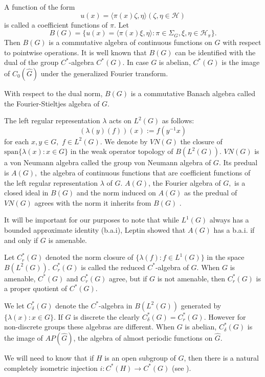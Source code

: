 \documentclass[10pt]{amsart}
\numberwithin{thm}{section}
\numberwithin{equation}{section}
\begin{document}
A function of the form 
\[
u(x)= {\langle} \pi (x)\zeta ,\eta {\rangle} (\zeta ,\eta \in \mathcal{H})\]
is called a coefficient functions of $\pi .$ Let 
\[
B(G)=\{u(x)= \langle\pi (x)\xi ,\eta \rangle: \pi \in \Sigma_{G},\xi ,\eta \in \mathcal{H}_{\pi }\}. 
\]
Then $B(G)$ is a commutative algebra of continuous functions on $G$ with
respect to pointwise operations. It is well known that $B(G)$ can be
identified with the dual of the group $C^{*}$-algebra $C^{*}(G)$. In case $G$ is abelian, $C^*(G)$ is the image of
$C_0(\widehat {G})$ under the generalized Fourier transform. 

 With
respect to the dual norm, $B(G)$ is a commutative Banach algebra called the
Fourier-Stieltjes algebra of $G.$

The left regular representation $\lambda $ acts on $L^{2}(G)$ as follows: 
\[
(\lambda (y)(f))(x) := f(y^{-1}x) 
\]
for each $x,y\in G,$ $f\in L^{2}(G).$ We denote by $VN(G)$ the closure of
$\text{span}\{\lambda (x): x\in G\}$ in the weak operator topology of $B(L^{2}(G)).$
$VN(G)$ is a von Neumann algebra called the group von Neumann
algebra of $G$. Its predual is $A(G),$ the algebra of continuous functions
that are coefficient functions of the left regular representation $\lambda $
of $G$. $A(G)$, the Fourier algebra of $G,$ is a closed ideal in $B(G)$ and
the norm induced on $A(G)$ as the predual of $VN(G)$ agrees with the norm it
inherits from $B(G)$ \cite{Eymard}.

It will be important for our purposes to note that while $L^{1}(G)$ always has a bounded 
approximate identity (b.a.i), Leptin \cite{Lep} showed that $A(G)$ has a b.a.i. if and only if
$G$ is amenable. 

Let $C^*_r(G)$ denoted the norm closure of $\{\lambda (f): f\in L^{1}(G)\}$ in the space 
$B(L^{2}(G))$. $C^*_r(G)$ is called the reduced $C^{*}$-algebra of $G$. When $G$ is amenable, 
$C^*(G)$ and $C^{*}_r(G)$ agree, but if $G$ is not amenable, then $C^{*}_r(G)$ is a proper quotient of 
$C^*(G)$.

We let $C^*_\delta (G)$ denote the $C^*$-algebra in $B(L^{2}(G))$ generated by 
$\{\lambda (x): x\in G\}$. If $G$ is discrete the clearly $C^*_\delta (G)=C^*_r(G)$. 
However for non-discrete groups these algebras are different. When $G$ is abelian,  
$C^*_\delta (G)$ is the image of $AP(\widehat {G})$, the algebra of almost periodic functions
on $\widehat {G}$. 

We will need to know that if $H$ is an open subgroup of $G$, then there is a natural 
completely isometric injection $i:C^*(H)\rightarrow C^*(G)$ (see \cite[Section 5]{BKLS}). 
\end{document}
